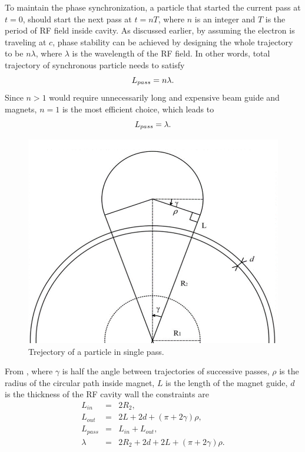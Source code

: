 \documentclass[a4paper,oneside,12pt]{report}
\numberwithin{equation}{chapter}
\begin{document}
To maintain the phase synchronization, a particle that started the current pass at $t=0$, should start the next pass at $t=nT$, where $n$ is an integer and $T$ is the period of RF field inside cavity.
As discussed earlier, by assuming the electron is traveling at $c$, phase stability can be achieved by designing the whole trajectory to be $n \lambda$, where $\lambda$ is the wavelength of the RF field. 
In other words, total trajectory of synchronous particle needs to satisfy
\vspace{-22pt}\begin{equation}
    L_{pass} = n \lambda .
\vspace{-22pt}\end{equation} 
Since $n>1$ would require unnecessarily long and expensive beam guide and magnets, $n=1$ is the most efficient choice, which leads to
\vspace{-22pt}\begin{equation}
    L_{pass} = \lambda .
\vspace{-10pt}\end{equation} 

\begin{figure}[H]    
    \centering
    \includegraphics[width=.7\linewidth]{./figures/design/magnet_design.png}
    \vspace{0pt}
    \caption{Trejectory of a particle in single pass.}
    \label{fig:magnet_design}
    \vspace{-15pt}
\end{figure}

From , where $\gamma$ is half the angle between trajectories of successive passes, $\rho$ is the radius of the circular path inside magnet, 
$L$ is the length of the magnet guide, $d$ is the thickness of the RF cavity wall the constraints are
\vspace{-22pt}\begin{eqnarray}
    L_{in} &=& 2R_2   , \\
    L_{out} &=& 2L + 2d + (\pi + 2\gamma)\rho  , \\
    L_{pass} &=& L_{in} + L_{out}  ,   \\
    \lambda &=& 2R_2 + 2d + 2L + (\pi + 2\gamma)\rho . \label{eq:magnet_lambda_constraint}
\end{eqnarray}
\end{document}
